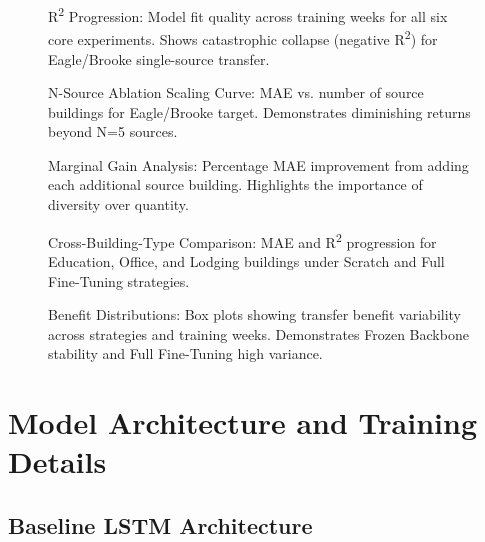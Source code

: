 \documentclass[12pt,a4paper]{report}
\begin{document}
\begin{figure}[H]
\centering
\caption{R\textsuperscript{2} Progression: Model fit quality across training weeks for all six core experiments. Shows catastrophic collapse (negative R\textsuperscript{2}) for Eagle/Brooke single-source transfer.}
\label{fig:r2_progression}
\end{figure}

\begin{figure}[H]
\centering
\caption{N-Source Ablation Scaling Curve: MAE vs. number of source buildings for Eagle/Brooke target. Demonstrates diminishing returns beyond N=5 sources.}
\label{fig:nsource_scaling}
\end{figure}

\begin{figure}[H]
\centering
\caption{Marginal Gain Analysis: Percentage MAE improvement from adding each additional source building. Highlights the importance of diversity over quantity.}
\label{fig:marginal_gain}
\end{figure}

\begin{figure}[H]
\centering
\caption{Cross-Building-Type Comparison: MAE and R\textsuperscript{2} progression for Education, Office, and Lodging buildings under Scratch and Full Fine-Tuning strategies.}
\label{fig:cross_type}
\end{figure}

\begin{figure}[H]
\centering
\caption{Benefit Distributions: Box plots showing transfer benefit variability across strategies and training weeks. Demonstrates Frozen Backbone stability and Full Fine-Tuning high variance.}
\label{fig:benefit_dist}
\end{figure}

\chapter{Model Architecture and Training Details}

\section{Baseline LSTM Architecture}
\end{document}
